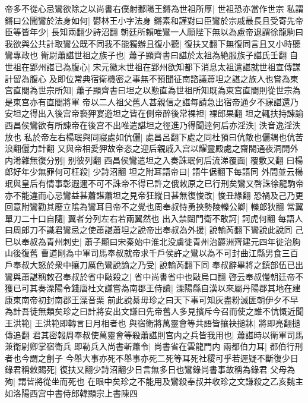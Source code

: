 帝多不從心忌鸞欲除之以尚書右僕射鄱陽王鏘為世祖所厚|{
	世祖恐亦當作世宗}
私謂鏘曰公聞鸞於法身如何|{
	鬰林王小字法身}
鏘素和謹對曰臣鸞於宗戚最長且受寄先帝臣等皆年少|{
	長知兩翻少詩沼翻}
朝廷所賴唯鸞一人願陛下無以為慮帝退謂徐龍駒曰我欲與公共計取鸞公既不同我不能獨辦且復小聽|{
	復扶又翻下無復同言且又小時聽鸞專政也}
衛尉蕭諶世祖之族子也|{
	蕭子顯齊書曰諶於太祖為絶服族子諶氏壬翻}
自世祖在郢州諶已為腹心|{
	宋元徽末世祖在郢州欲知都下消息太祖遣諶就世祖宣傳謀計留為腹心}
及即位常典宿衛機密之事無不預聞征南諮議蕭坦之諶之族人也嘗為東宫直閤為世宗所知|{
	蕭子顯齊書曰坦之以懃直為世祖所知既為東宫直閤則從世宗為是東宫亦有直閤將軍}
帝以二人祖父舊人甚親信之諶每請急出宿帝通夕不寐諶還乃安坦之得出入後宫帝䙝狎宴遊坦之皆在側帝醉後常裸袒|{
	裸郎果翻}
坦之輒扶持諫諭西昌侯鸞欲有所諫帝在後宫不出唯遣諶坦之徑進乃得聞逹何后亦淫泆|{
	泆音逸淫泆放也}
私於帝左右楊珉與同寢處如伉儷|{
	處昌呂翻下處之同杜預曰伉敵也儷耦也伉苦浪翻儷力計翻}
又與帝相愛狎故帝恣之迎后親戚入宫以耀靈殿處之齋閤通夜洞開外内淆雜無復分别|{
	别彼列翻}
西昌侯鸞遣坦之入奏誅珉何后流涕覆面|{
	覆敷又翻}
曰楊郎好年少無罪何可枉殺|{
	少詩沼翻}
坦之附耳語帝曰|{
	語牛倨翻下每語同}
外間並云楊珉與皇后有情事彰遐邇不可不誅帝不得已許之俄敇原之已行刑矣鸞又啓誅徐龍駒帝亦不能違而心忌鸞益甚蕭諶蕭坦之見帝狂縱日甚無復悛改|{
	悛丑緣翻}
恐禍及己乃更回意附鸞勸其廢立隂為鸞耳目帝不之覺也周奉叔恃勇挾勢陵轢公卿|{
	轢郎狄翻}
常翼單刀二十口自隨|{
	翼者分列左右若兩翼然也}
出入禁闥門衛不敢訶|{
	訶虎何翻}
每語人曰周郎刀不識君鸞忌之使蕭諶蕭坦之說帝出奉叔為外援|{
	說輸芮翻下鸞說此說同}
己巳以奉叔為青州刺史|{
	蕭子顯曰宋秦始中淮北没虜徙青州治欝洲齊建元四年徙治胊山後復舊}
曹道剛為中軍司馬奉叔就帝求千戶侯許之鸞以為不可封曲江縣男食三百戶奉叔大怒於衆中攘刀厲色鸞說諭之乃受|{
	說輸芮翻下同}
奉叔辭畢將之鎮部伍已出鸞與蕭諶稱敇召奉叔於省中敺殺之|{
	省中尚書省中也敺烏口翻}
啓云奉叔慢朝廷帝不獲已可其奏溧陽令錢唐杜文謙嘗為南郡王侍讀|{
	溧陽縣自漢以來屬丹陽郡其地在建康東南帝初封南郡王溧音栗}
前此說綦毋珍之曰天下事可知灰盡粉滅匪朝伊夕不早為計吾徒無類矣珍之曰計將安出文謙曰先帝舊人多見擯斥今召而使之誰不忼慨近聞王洪範|{
	王洪範即轉言日月相者也}
與宿衛將萬靈會等共語皆攘袂搥牀|{
	將即亮翻搥傳追翻}
君其密報周奉叔使萬靈會等殺蕭諶則宫内之兵皆我用也|{
	蕭諶時以衛軍司馬兼衛尉卿掌宿衛兵}
即勒兵入尚書斬蕭令|{
	尚書省在雲龍門内}
兩都伯力耳|{
	都伯行刑者也今謂之劊子}
今舉大事亦死不舉事亦死二死等耳死社稷可乎若遲疑不斷復少日錄君稱敕賜死|{
	復扶又翻少詩沼翻少日言無多日也鸞錄尚書事故稱為錄君}
父母為殉|{
	謂皆將從坐而死也}
在眼中矣珍之不能用及鸞殺奉叔并收珍之文謙殺之乙亥魏主如洛陽西宫中書侍郎韓顯宗上書陳四

